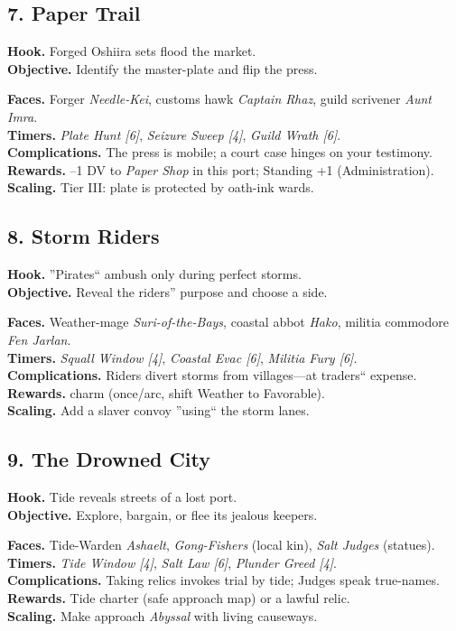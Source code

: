 \documentclass[11pt,oneside]{book}
\newcommand{\tagpill}[1]{\begingroup
  \setlength{\fboxsep}{1pt}\color{black}\fbox{\footnotesize\textsf{#1}}
\endgroup}
\begin{document}
\begin{itemize}
\subsection*{7. Paper Trail}
\textbf{Hook.} Forged Oshiira sets flood the market.\\
\textbf{Objective.} Identify the master-plate and flip the press.

\textbf{Faces.} Forger \emph{Needle-Kei}, customs hawk \emph{Captain Rhaz}, guild scrivener \emph{Aunt Imra}.\\
\textbf{Timers.} \emph{Plate Hunt [6]}, \emph{Seizure Sweep [4]}, \emph{Guild Wrath [6]}.\\
\textbf{Complications.} The press is mobile; a court case hinges on your testimony.\\
\textbf{Rewards.} --1 DV to \emph{Paper Shop} in this port; Standing +1 (Administration).\\
\textbf{Scaling.} Tier III: plate is protected by oath-ink wards.

\subsection*{8. Storm Riders}
\textbf{Hook.} ''Pirates`` ambush only during perfect storms.\\
\textbf{Objective.} Reveal the riders'' purpose and choose a side.

\textbf{Faces.} Weather-mage \emph{Suri-of-the-Bays}, coastal abbot \emph{Hako}, militia commodore \emph{Fen Jarlan}.\\
\textbf{Timers.} \emph{Squall Window [4]}, \emph{Coastal Evac [6]}, \emph{Militia Fury [6]}.\\
\textbf{Complications.} Riders divert storms from villages---at traders`` expense.\\
\textbf{Rewards.} \tagpill{WIND CALL} charm (once/arc, shift Weather to Favorable).\\
\textbf{Scaling.} Add a slaver convoy ''using`` the storm lanes.

\subsection*{9. The Drowned City}
\textbf{Hook.} Tide reveals streets of a lost port.\\
\textbf{Objective.} Explore, bargain, or flee its jealous keepers.

\textbf{Faces.} Tide-Warden \emph{Ashaelt}, \emph{Gong-Fishers} (local kin), \emph{Salt Judges} (statues).\\
\textbf{Timers.} \emph{Tide Window [4]}, \emph{Salt Law [6]}, \emph{Plunder Greed [4]}.\\
\textbf{Complications.} Taking relics invokes trial by tide; Judges speak true-names.\\
\textbf{Rewards.} Tide charter (safe approach map) or a lawful relic.\\
\textbf{Scaling.} Make approach \emph{Abyssal} with living causeways.


\end{itemize}
\end{document}
